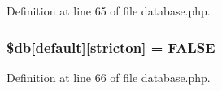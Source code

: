 Definition at line 65 of file database.\+php.

\subsubsection[{\texorpdfstring{\$db}{$db}}]{\setlength{\rightskip}{0pt plus 5cm}\$db\mbox{[}\textquotesingle{}default\textquotesingle{}\mbox{]}\mbox{[}\textquotesingle{}stricton\textquotesingle{}\mbox{]} = F\+A\+L\+SE}\hypertarget{database_8php_a5722ababeee63dd26d82734e3fa83b7c}{}\label{database_8php_a5722ababeee63dd26d82734e3fa83b7c}


Definition at line 66 of file database.\+php.

